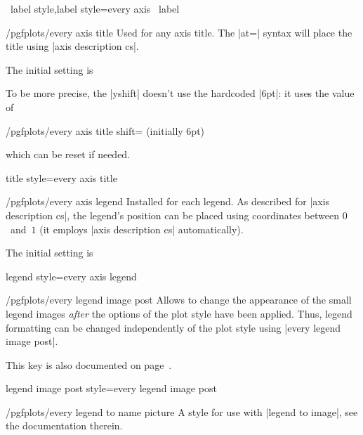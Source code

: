 \pgfplotsshortxystylekeys \x\ label style,\x label style=every axis \x\ label\pgfeov

\begin{stylekey}{/pgfplots/every axis title}
 Used for any axis title. The |at=| syntax will place the title using |axis description cs|.

The initial setting is
\begin{codeexample}
\end{codeexample}

To be more precise, the |yshift| doesn't use the hardcoded |6pt|: it uses the value of
\begin{key}{/pgfplots/every axis title shift= (initially 6pt)}
\end{key}
which can be reset if needed.
\end{stylekey}

\pgfplotsshortstylekey title style=every axis title\pgfeov

\begin{stylekey}{/pgfplots/every axis legend}
 Installed for each legend. As described for |axis description cs|, the legend's position can be placed using coordinates between $0$~and~$1$ (it employs |axis description cs| automatically).

 The initial setting is
\begin{codeexample}
\end{codeexample}
\end{stylekey}

\pgfplotsshortstylekey legend style=every axis legend\pgfeov

\begin{stylekey}{/pgfplots/every legend image post}
	Allows to change the appearance of the small legend images \emph{after} the options of the plot style have been applied. Thus, legend formatting can be changed independently of the plot style using |every legend image post|.

	This key is also documented on page~\pageref{key:legendimagepost}.
\end{stylekey}
\pgfplotsshortstylekey legend image post style=every legend image post\pgfeov

\begin{stylekey}{/pgfplots/every legend to name picture}
	A style for use with |legend to image|, see the documentation therein.
\end{stylekey}

